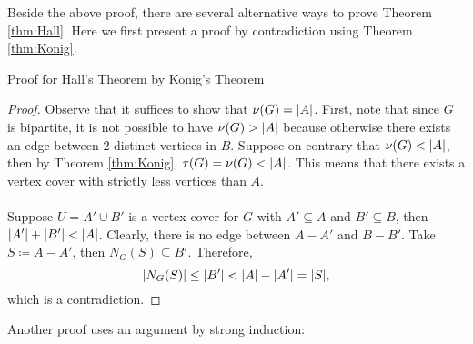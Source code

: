 \documentclass[math, code]{amznotes}
\theoremstyle{remark}
\begin{document}
Beside the above proof, there are several alternative ways to prove Theorem \ref{thm:Hall}. Here we first present a proof by contradiction using Theorem \ref{thm:Konig}.
\begin{genbox}{Proof for Hall's Theorem by K\"{o}nig's Theorem}
    \begin{proof}
        Observe that it suffices to show that $\nu(G) = {\left\lvert {A} \right\rvert}$. First, note that since $G$ is bipartite, it is not possible to have $\nu(G) > {\left\lvert {A} \right\rvert}$ because otherwise there exists an edge between $2$ distinct vertices in $B$. Suppose on contrary that $\nu(G) < {\left\lvert {A} \right\rvert}$, then by Theorem \ref{thm:Konig}, $\tau(G) = \nu(G) < {\left\lvert {A} \right\rvert}$. This means that there exists a vertex cover with strictly less vertices than $A$.
        \\\\
        Suppose $U = A' \cup B'$ is a vertex cover for $G$ with $A' \subseteq A$ and $B' \subseteq B$, then ${\left\lvert {A'} \right\rvert} + {\left\lvert {B'} \right\rvert} < {\left\lvert {A} \right\rvert}$. Clearly, there is no edge between $A - A'$ and $B - B'$. Take $S \coloneqq A - A'$, then $N_G(S) \subseteq B'$. Therefore,
        \begin{equation*}
            {\left\lvert {N_G(S)} \right\rvert} \leq {\left\lvert {B'} \right\rvert} < {\left\lvert {A} \right\rvert} - {\left\lvert {A'} \right\rvert} = {\left\lvert {S} \right\rvert},
        \end{equation*}
        which is a contradiction.
    \end{proof}
\end{genbox}
Another proof uses an argument by strong induction:
\end{document}
